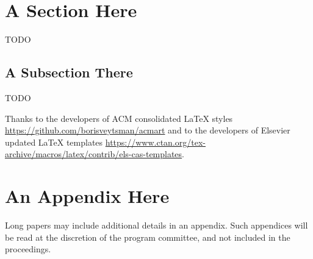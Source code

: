 \documentclass{ceurart}
\begin{document}
\maketitle




\section{A Section Here}

TODO \cite{DBLP:conf/datalog/Pichler22}

\subsection{A Subsection There}

TODO



\begin{acknowledgments}
  Thanks to the developers of ACM consolidated LaTeX styles
  \url{https://github.com/borisveytsman/acmart} and to the developers
  of Elsevier updated \LaTeX{} templates
  \url{https://www.ctan.org/tex-archive/macros/latex/contrib/els-cas-templates}.  
\end{acknowledgments}



\clearpage
\appendix

\section{An Appendix Here}

Long papers may include additional details in an appendix.
Such appendices will be read at the discretion of the program committee, and not included in the proceedings.
\end{document}

